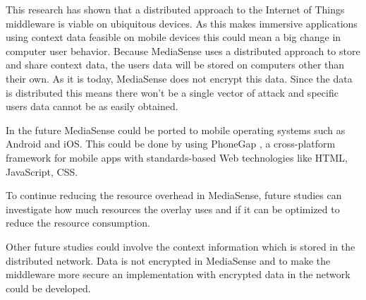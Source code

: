 This research has shown that a distributed approach to the Internet of Things middleware is viable on ubiquitous devices. As this makes immersive applications using context data feasible on mobile devices this could mean a big change in computer user behavior.
Because MediaSense uses a distributed approach to store and share context data, the users data will be stored on computers other than their own. As it is today, MediaSense does not encrypt this data. Since the data is distributed this means there won't be a single vector of attack and specific users data cannot be as easily obtained. 

In the future MediaSense could be ported to mobile operating systems such as Android and iOS. This could be done by using PhoneGap \cite{phonegap}, a cross-platform framework for mobile apps with standards-based Web technologies like HTML, JavaScript, CSS. 

To continue reducing the resource overhead in MediaSense, future studies can investigate how much resources the overlay uses and if it can be optimized to reduce the resource consumption. 

Other future studies could involve the context information which is stored in the distributed network. Data is not encrypted in MediaSense and to make the middleware more secure an implementation with encrypted data in the network could be developed.
